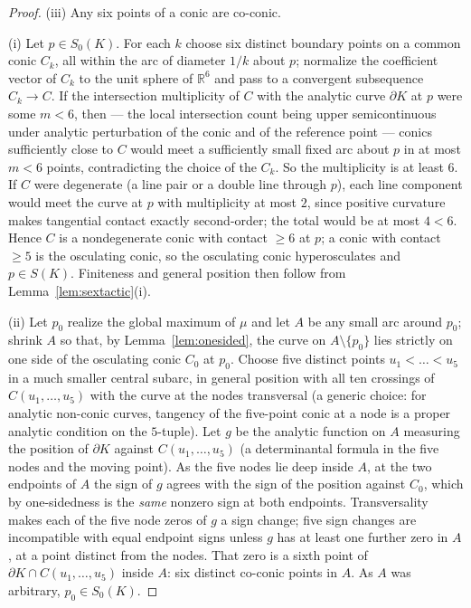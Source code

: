 \documentclass[11pt]{amsart}
\theoremstyle{definition}
\newcommand{\R}{\mathbb{R}}
\begin{document}
\begin{proof}
(iii) Any six points of a conic are co-conic.

(i) Let $p\in S_0(K)$. For each $k$ choose six distinct boundary points on a
common conic $C_k$, all within the arc of diameter $1/k$ about $p$; normalize
the coefficient vector of $C_k$ to the unit sphere of $\R^6$ and pass to a
convergent subsequence $C_k\to C$. If the intersection multiplicity of $C$
with the analytic curve $\partial K$ at $p$ were some $m<6$, then --- the local
intersection count being upper semicontinuous under analytic perturbation of
the conic and of the reference point --- conics sufficiently close to $C$ would
meet a sufficiently small fixed arc about $p$ in at most $m<6$ points,
contradicting the choice of the $C_k$. So the multiplicity is at least $6$.
If $C$ were degenerate (a line pair or a double line through $p$), each line
component would meet the curve at $p$ with multiplicity at most $2$, since
positive curvature makes tangential contact exactly second-order; the total
would be at most $4<6$. Hence $C$ is a nondegenerate conic with contact
$\ge6$ at $p$; a conic with contact $\ge5$ is the osculating conic, so the
osculating conic hyperosculates and $p\in S(K)$. Finiteness and general
position then follow from Lemma~\ref{lem:sextactic}(i).

(ii) Let $p_0$ realize the global maximum of $\mu$ and let $A$ be any small
arc around $p_0$; shrink $A$ so that, by Lemma~\ref{lem:onesided}, the curve
on $A\setminus\{p_0\}$ lies strictly on one side of the osculating conic
$C_0$ at $p_0$. Choose five distinct points $u_1<\dots<u_5$ in a much smaller
central subarc, in general position with all ten crossings of
$C(u_1,\dots,u_5)$ with the curve at the nodes transversal (a generic choice:
for analytic non-conic curves, tangency of the five-point conic at a node is a
proper analytic condition on the $5$-tuple). Let $g$ be the analytic function
on $A$ measuring the position of $\partial K$ against $C(u_1,\dots,u_5)$
(a determinantal formula in the five nodes and the moving point). As the five
nodes lie deep inside $A$, at the two endpoints of $A$ the sign of $g$ agrees
with the sign of the position against $C_0$, which by one-sidedness is the
\emph{same} nonzero sign at both endpoints. Transversality makes each of the
five node zeros of $g$ a sign change; five sign changes are incompatible with
equal endpoint signs unless $g$ has at least one further zero in $A$, at a
point distinct from the nodes. That zero is a sixth point of
$\partial K\cap C(u_1,\dots,u_5)$ inside $A$: six distinct co-conic points in
$A$. As $A$ was arbitrary, $p_0\in S_0(K)$.
\end{proof}
\end{document}
